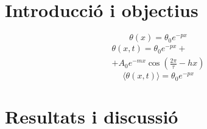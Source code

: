 \documentclass[12pt,twosides,onecolumn,openany]{article}
\begin{document}
\begin{multicols}{2}
\section{Introducció i objectius}
\begin{equation}\label{sol_estacionaria}
  \theta(x) = \theta_0e^{-px}
\end{equation}
\begin{multline}\label{sol_permanent}
  \theta(x,t) = \theta_0e^{-px} +\\
   + A_0e^{-mx}\cos{\left( \frac{2\pi}{\tau} -hx \right)} 
\end{multline}
\begin{equation}\label{prom_temp}
  \langle \theta(x,t) \rangle = \theta_0e^{-px}  
\end{equation}
\section{Resultats i discussió}

\end{multicols}
\end{document}
